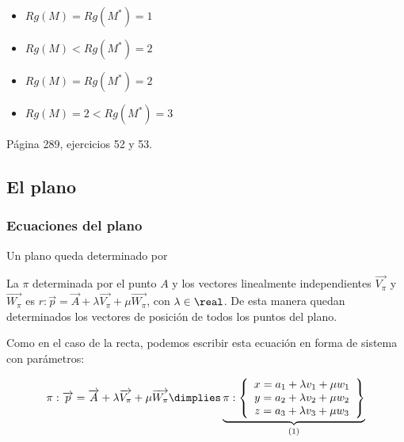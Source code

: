 \begin{framed}
  \begin{itemize}
    \item $Rg(M) = Rg(M^*) = 1 $
    \item $Rg(M) < Rg(M^*) = 2 $ 
    \item $Rg(M) = Rg(M^*) = 2 $
    \item $Rg(M) = 2 < Rg(M^*) = 3 $ 
  \end{itemize}  
\end{framed}

\begin{problem}
Página 289, ejercicios 52 y 53.
\solution

\end{problem}

\subsection{El plano}

\subsubsection{Ecuaciones del plano}

Un plano queda determinado por 

La 
%
%
$\pi$ determinada por el punto $A$ y los vectores linealmente independientes $\vec{V_{\pi}}$ y $\vec{W_{\pi}}$  es $r : \vec{p} = \vec{A} + \lambda \vec{V_{\pi}} + \mu\vec{W_{\pi}}$, con $\lambda\in\real$. De esta manera quedan determinados los vectores de posición de todos los puntos del plano.

Como en el caso de la recta, podemos escribir esta ecuación en forma de sistema con parámetros:

$$\pi : \vec{p} = \vec{A} + \lambda \vec{V_{\pi}} + \mu\vec{W_{\pi}}\dimplies \underbrace{\pi:\displaystyle \left\{\begin{array}{c} x = a_1 + \lambda v_1 + \mu w_1\\y = a_2 + \lambda v_2 + \mu w_2 \\ z = a_3 + \lambda v_3 + \mu w_3 \end{array}\right\}}_{(1)} $$

